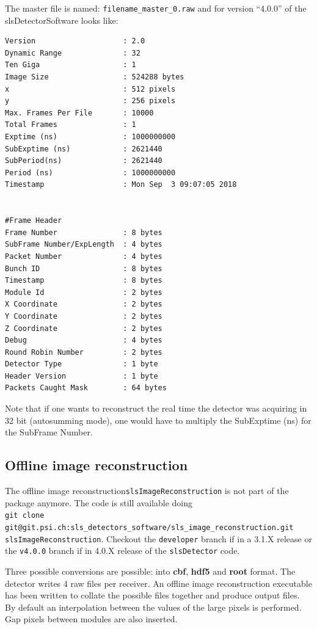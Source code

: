 \documentclass{article}
\begin{document}
The master file is named: {\tt{filename\_master\_0.raw}} and for version ``4.0.0'' of the slsDetectorSoftware looks like:
 
\begin{verbatim}
Version                    : 2.0
Dynamic Range              : 32
Ten Giga                   : 1
Image Size                 : 524288 bytes
x                          : 512 pixels
y                          : 256 pixels
Max. Frames Per File       : 10000
Total Frames               : 1
Exptime (ns)               : 1000000000
SubExptime (ns)            : 2621440
SubPeriod(ns)              : 2621440
Period (ns)                : 1000000000
Timestamp                  : Mon Sep  3 09:07:05 2018


#Frame Header
Frame Number               : 8 bytes
SubFrame Number/ExpLength  : 4 bytes
Packet Number              : 4 bytes
Bunch ID                   : 8 bytes
Timestamp                  : 8 bytes
Module Id                  : 2 bytes
X Coordinate               : 2 bytes
Y Coordinate               : 2 bytes
Z Coordinate               : 2 bytes
Debug                      : 4 bytes
Round Robin Number         : 2 bytes
Detector Type              : 1 byte
Header Version             : 1 byte
Packets Caught Mask        : 64 bytes
\end{verbatim}

Note that if one wants to  reconstruct the real time the detector was acquiring in 32 bit (autosumming mode), one would have to multiply the SubExptime (ns) for the SubFrame Number. 

\subsection{Offline image reconstruction}
The offline image reconstruction{\tt{slsImageReconstruction}} is not part of the package anymore. The code is still available doing \\
{\tt{git clone git@git.psi.ch:sls\_detectors\_software/sls\_image\_reconstruction.git slsImageReconstruction}}.
Checkout the {\tt{developer}} branch if in a 3.1.X release or the {\tt{v4.0.0}} branch if in 4.0.X release of the {\tt{slsDetector}} code.

Three possible conversions are possible: into \textbf{cbf}, \textbf{hdf5} and \textbf{root} format. The detector writes 4 raw files per receiver. An offline image reconstruction executable has been written to collate the possible files together and produce output files. By default an interpolation between the values of the large pixels is performed. Gap pixels between modules are also inserted.
\end{document}
